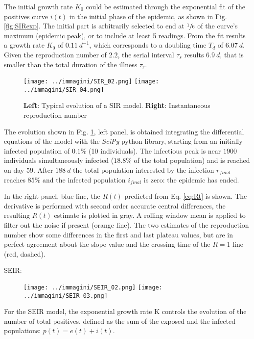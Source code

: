\documentclass[DIV=12, BCOR=0pt]{scrartcl}  %
\begin{document}
	The initial growth rate $K_0$ could be estimated through the exponential fit of the positives curve $i(t)$ in the initial phase of the epidemic, as shown in Fig. \ref{fig:SIRexp}. The initial part is arbitrarily selected to end at $\sfrac{1}{6}$ of the curve's maximum (epidemic peak), or to include at least 5 readings. From the fit results a growth rate $K_0$ of $0.11 \ d^{-1}$, which corresponds to a doubling time $T_{d}$ of $6.07 \ d$. Given the reproduction number of $2.2$, the serial interval $\tau_{s}$ results $6.9 \ d$, that is smaller than the total duration of the illness $\tau_{r}$.

	\begin{figure}[h!]
		\centering
		\texttt{[image: ../immagini/SIR\_02.png]}
		\texttt{[image: ../immagini/SIR\_04.png]}
		\caption{\textbf{Left}: Typical evolution of a SIR model. \textbf{Right}: Instantaneous reproduction number }
		\label{fig:SIRtot}
	\end{figure}
	The evolution shown in Fig. \ref{fig:SIRtot}, left panel, is obtained integrating the differential equations of the model with the \textit{SciPy} python library, starting from an initially infected population of $0.1 \%$ (10 individuals). 
	The infectious peak is near $1900$ individuals simultaneously infected ($18.8 \%$ of the total population) and is reached on day 59. After $188 \ d$ the total population interested by the infection $r_{final}$ reaches $85 \%$ and the infected population $i_{final}$ is zero: the epidemic has ended. 
	
	In the right panel, blue line, the $R(t)$ predicted from Eq. \ref{eq:Rt} is shown. 
	The derivative is performed with second order accurate central differences, the resulting $R(t)$ estimate is plotted in gray. A rolling window mean is applied to filter out the noise if present (orange line). The two estimates of the reproduction number show some differences in the first and last plateau values, but are in perfect agreement about the slope value and the crossing time of the $R = 1$ line (red, dashed).
	
	
	SEIR:	
	\begin{figure}[h]
		\centering
		\texttt{[image: ../immagini/SEIR\_02.png]}
		\texttt{[image: ../immagini/SEIR\_03.png]}
		\caption{}
		\label{}
	\end{figure}
	
	For the SEIR model, the exponential growth rate K controls the evolution of the number of total positives, defined as the sum of the exposed and the infected populations: $p(t) = e(t) + i(t)$. 
	
\end{document}
